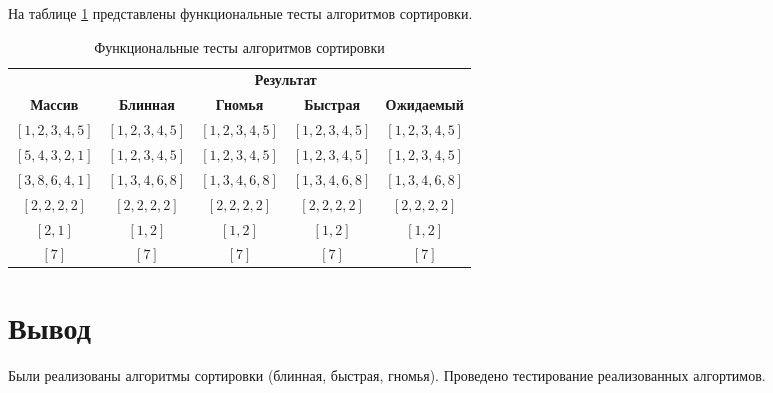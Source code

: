 На таблице \ref{tbl:func-tests} представлены функциональные тесты алгоритмов сортировки.

\begin{table}[H]
    \small
	\begin{center}
		\caption{Функциональные тесты алгоритмов сортировки}
		\label{tbl:func-tests}  
            \begin{tabular}{|c|c|c|c|c|}
            \hline
            & \multicolumn{4}{c|}{\textbf{Результат}} \\
            \cline{2-5}
            \textbf{Массив} & \textbf{Блинная} & \textbf{Гномья} & \textbf{Быстрая} & \textbf{Ожидаемый} \\
            \hline
            $[1, 2, 3, 4, 5]$ & $[1, 2, 3, 4, 5]$ & $[1, 2, 3, 4, 5]$ & $[1, 2, 3, 4, 5]$ & $[1, 2, 3, 4, 5]$ \\
            \hline
            $[5, 4, 3, 2, 1]$ & $[1, 2, 3, 4, 5]$ & $[1, 2, 3, 4, 5]$ & $[1, 2, 3, 4, 5]$ & $[1, 2, 3, 4, 5]$ \\
            \hline
            $[3, 8, 6, 4, 1]$ & $[1, 3, 4, 6, 8]$ & $[1, 3, 4, 6, 8]$ & $[1, 3, 4, 6, 8]$ & $[1, 3, 4, 6, 8]$ \\
            \hline
            $[2, 2, 2, 2]$ & $[2, 2, 2, 2]$ & $[2, 2, 2, 2]$ & $[2, 2, 2, 2]$ & $[2, 2, 2, 2]$ \\
            \hline
            $[2, 1]$ & $[1, 2]$ & $[1, 2]$ & $[1, 2]$ & $[1, 2]$ \\
            \hline
            $[7]$ & $[7]$ & $[7]$ & $[7]$ & $[7]$ \\
            \hline
        \end{tabular}
	\end{center}
\end{table}

\section*{Вывод}

Были реализованы алгоритмы сортировки (блинная, быстрая, гномья).
Проведено тестирование реализованных алгортимов.
